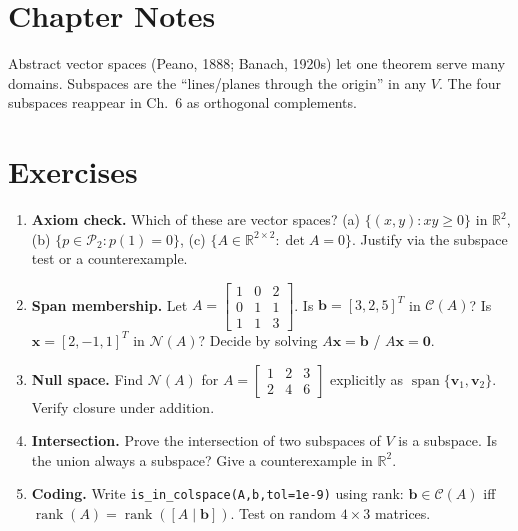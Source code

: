 \section{Chapter Notes}
Abstract vector spaces (Peano, 1888; Banach, 1920s) let one theorem serve many domains. Subspaces are the ``lines/planes through the origin'' in any $V$. The four subspaces reappear in Ch.~6 as orthogonal complements.

\section{Exercises}
\label{sec:ch04-exercises}
\begin{enumerate}[label=E4.\arabic*, leftmargin=*, itemsep=0.8em]
\item \textbf{Axiom check.} Which of these are vector spaces? (a) $\{(x,y):xy\ge0\}$ in $\mathbb{R}^2$, (b) $\{p\in\mathcal{P}_2:p(1)=0\}$, (c) $\{A\in\mathbb{R}^{2\times2}:\det A=0\}$. Justify via the subspace test or a counterexample.
\item \textbf{Span membership.} Let $A=\begin{bmatrix}1&0&2\\0&1&1\\1&1&3\end{bmatrix}$. Is $\mathbf{b}=[3,2,5]^T$ in $\mathcal{C}(A)$? Is $\mathbf{x}=[2,-1,1]^T$ in $\mathcal{N}(A)$? Decide by solving $A\mathbf{x}=\mathbf{b}$ / $A\mathbf{x}=\mathbf{0}$.
\item \textbf{Null space.} Find $\mathcal{N}(A)$ for $A=\begin{bmatrix}1&2&3\\2&4&6\end{bmatrix}$ explicitly as $\operatorname{span}\{\mathbf{v}_1,\mathbf{v}_2\}$. Verify closure under addition.
\item \textbf{Intersection.} Prove the intersection of two subspaces of $V$ is a subspace. Is the union always a subspace? Give a counterexample in $\mathbb{R}^2$.
\item \textbf{Coding.} Write \texttt{is\_in\_colspace(A,b,tol=1e-9)} using rank: $\mathbf{b}\in\mathcal{C}(A)$ iff $\operatorname{rank}(A)=\operatorname{rank}([A\mid\mathbf{b}])$. Test on random $4\times3$ matrices.
\end{enumerate}
